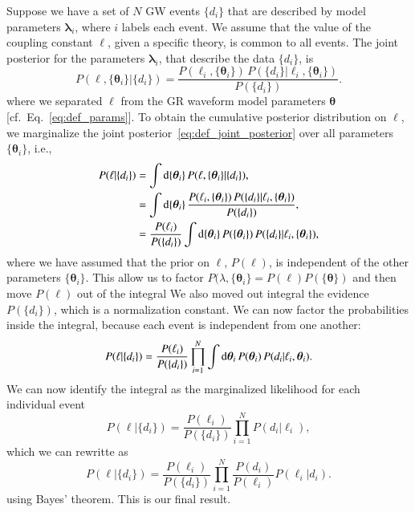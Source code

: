 \documentclass[twocolumn,
               prd,
               aps,
               superscriptaddress,
               tightenlines,
               nofootinbib,
               eqsecnum,
               amsfonts,
               amsmath,
               longbibliography]{revtex4-1}
\newcommand{\btheta}{\bm{\theta}}
\newcommand{\dd}{{\rm d}}
\begin{document}
Suppose we have a set of $N$ GW events $\{d_{i}\}$ that are described by
model parameters $\bm{\lambda}_{i}$, where $i$ labels each event.
%
We assume that the value of the coupling constant $\ell$, given a specific theory,
is common to all events.
%
%
The joint posterior for the parameters $\bm{\lambda}_{i}$, that describe the
data $\{d_{i}\}$, is
%
\begin{equation}
P(\ell, \{\btheta_i\} | \{d_{i}\})
= \frac{ P(\ell_i, \{\btheta_i\}) \, P( \{d_i\} | \ell_i, \{\btheta_i\} ) }{ P(\{d_i\}) }.
\label{eq:def_joint_posterior}
\end{equation}
%
where we separated $\ell$ from the GR waveform model parameters $\btheta$ [cf.~Eq.~\eqref{eq:def_params}].
%
%
To obtain the cumulative posterior distribution on $\ell$, we marginalize
the joint posterior~\eqref{eq:def_joint_posterior} over
all parameters $\{ \btheta_i \}$, i.e.,
%
\begin{align}
P(\ell | \{d_i\}) &= \int \dd \{\btheta_i\} \, P(\ell, \{\btheta_i\} | \{d_{i}\}),
\nonumber \\
                  &= \int \dd \{\btheta_i\} \, \frac{ P(\ell_i, \{\btheta_i\}) \, P( \{d_i\} | \ell_i, \{\btheta_i\} ) }{ P(\{d_i\}) },
\nonumber \\
                  &= \frac{P(\ell_i)}{P(\{d_i\})} \int \dd \{\btheta_i\} \, P(\{\btheta_i\}) \, P( \{d_i\} | \ell_i, \{\btheta_i\} ),
\end{align}
%
where we have assumed that the prior on $\ell$, $P(\ell)$, is independent of
the other parameters $\{\btheta_i\}$.
%
This allow us to factor $P(\lambda, \{\btheta_i\} = P(\ell) P(\{\btheta\})$
and then move $P(\ell)$ out of the integral
%
We also moved out integral the evidence $P(\{d_i\})$, which is a normalization constant.
%
We can now factor the probabilities inside the integral, because each event is independent from one another:
%
\begin{equation}
P(\ell | \{d_i\}) = \frac{P(\ell_i)}{P(\{d_i\})}
\prod_{i=1}^{N}
\int \dd \btheta_i \, P(\btheta_i) \, P( d_i | \ell_i, \btheta_i ).
\end{equation}
%
We can now identify the integral as the marginalized likelihood for each individual event
%
\begin{equation}
P(\ell | \{d_i\}) = \frac{P(\ell_i)}{P(\{d_i\})}
\prod_{i=1}^{N} P( d_i | \ell_i ),
\end{equation}
%
which we can rewritte as
%
\begin{equation}
P(\ell | \{d_i\}) = \frac{P(\ell_i)}{P(\{d_i\})}
\prod_{i=1}^{N} \frac{P(d_i)}{P(\ell_i)} P(\ell_i | d_i).
\label{eq:cumulative_dist_ell}
\end{equation}
%
using Bayes' theorem. This is our final result.
\end{document}
